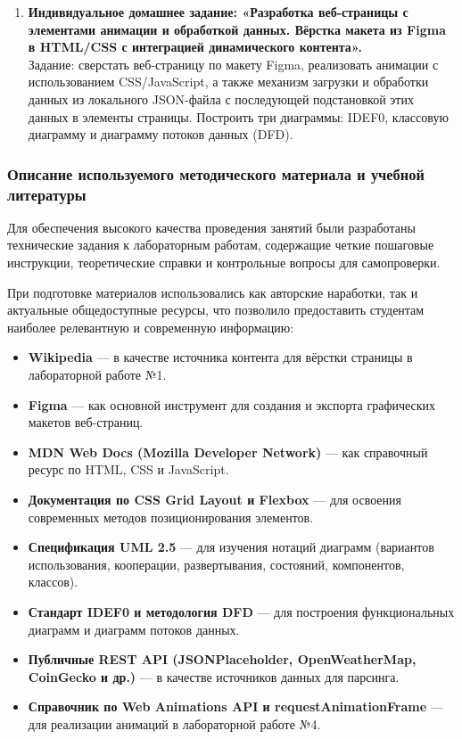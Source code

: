 \begin{enumerate}
    \item \textbf{Индивидуальное домашнее задание: «Разработка веб-страницы с элементами анимации и обработкой данных. Вёрстка макета из Figma в HTML/CSS с интеграцией динамического контента».} \\
    Задание: сверстать веб-страницу по макету Figma, реализовать анимации с использованием CSS/JavaScript, а также механизм загрузки и обработки данных из локального JSON-файла с последующей подстановкой этих данных в элементы страницы. Построить три диаграммы: IDEF0, классовую диаграмму и диаграмму потоков данных (DFD).
\end{enumerate}

\subsubsection{Описание используемого методического материала и учебной литературы}

Для обеспечения высокого качества проведения занятий были разработаны технические задания к лабораторным работам, содержащие четкие пошаговые инструкции, теоретические справки и контрольные вопросы для самопроверки.

При подготовке материалов использовались как авторские наработки, так и актуальные общедоступные ресурсы, что позволило предоставить студентам наиболее релевантную и современную информацию:
\begin{itemize}
    \item \textbf{Wikipedia} — в качестве источника контента для вёрстки страницы в лабораторной работе №1.
    \item \textbf{Figma} — как основной инструмент для создания и экспорта графических макетов веб-страниц.
    \item \textbf{MDN Web Docs (Mozilla Developer Network)} — как справочный ресурс по HTML, CSS и JavaScript.
    \item \textbf{Документация по CSS Grid Layout и Flexbox} — для освоения современных методов позиционирования элементов.
    \item \textbf{Спецификация UML 2.5} — для изучения нотаций диаграмм (вариантов использования, кооперации, развертывания, состояний, компонентов, классов).
    \item \textbf{Стандарт IDEF0 и методология DFD} — для построения функциональных диаграмм и диаграмм потоков данных.
    \item \textbf{Публичные REST API (JSONPlaceholder, OpenWeatherMap, CoinGecko и др.)} — в качестве источников данных для парсинга.
    \item \textbf{Справочник по Web Animations API и requestAnimationFrame} — для реализации анимаций в лабораторной работе №4.
\end{itemize}

